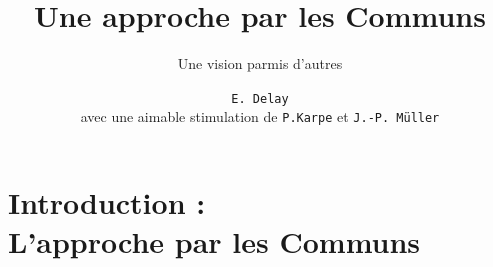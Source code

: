 \documentclass[newPxFont]{beamer}
\title{Une approche par les Communs}
\subtitle{Une vision parmis d'autres}
\author{\texttt{E. Delay}\\
avec une aimable stimulation de \texttt{P.Karpe} et \texttt{J.-P. Müller}}
\institute{CIRAD -- UMR SENS}
\begin{document}
%
%


\maketitle


%
%


\section{Introduction :\\ L'approche par les Communs}
\end{document}
